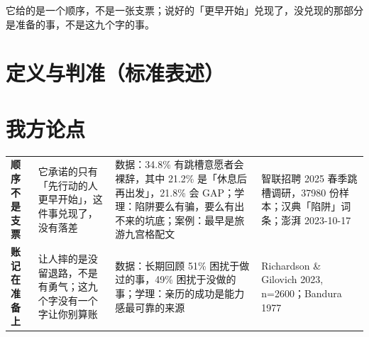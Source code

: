 \documentclass[quick,con]{debate}
\begin{document}
\debatetitle
\begin{thesisbox}它给的是一个顺序，不是一张支票；说好的「更早开始」兑现了，没兑现的那部分是准备的事，不是这九个字的事。\end{thesisbox}

\section{定义与判准（标准表述）}
\begin{fields}
\end{fields}

\section{我方论点}
\begin{tabularx}{\linewidth}{@{}L{4.6em}Y Y L{7em}@{}}\toprule
{}&&&\\\midrule
\textbf{顺序不是支票}&它承诺的只有「先行动的人更早开始」，这件事兑现了，没有落差&数据：34.8\% 有跳槽意愿者会裸辞，其中 21.2\% 是「休息后再出发」，21.8\% 会 GAP；学理：陷阱要么有骗，要么有出不来的坑底；案例：最早是旅游九宫格配文&智联招聘 2025 春季跳槽调研，37980 份样本；汉典「陷阱」词条；澎湃 2023-10-17\\
\textbf{账记在准备上}&让人摔的是没留退路，不是有勇气；这九个字没有一个字让你别算账&数据：长期回顾 51\% 困扰于做过的事，49\% 困扰于没做的事；学理：亲历的成功是能力感最可靠的来源&Richardson \& Gilovich 2023, n=2600；Bandura 1977\\
\bottomrule\end{tabularx}
\end{document}
